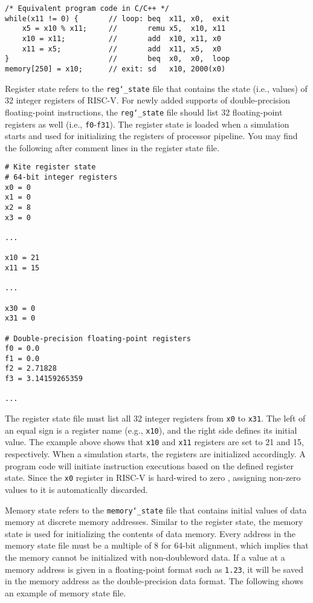 \documentclass[10pt]{article}
\begin{document}
\begin{Verbatim}[frame=single]
/* Equivalent program code in C/C++ */
while(x11 != 0) {       // loop: beq  x11, x0,  exit
    x5 = x10 % x11;     //       remu x5,  x10, x11
    x10 = x11;          //       add  x10, x11, x0
    x11 = x5;           //       add  x11, x5,  x0
}                       //       beq  x0,  x0,  loop
memory[250] = x10;      // exit: sd   x10, 2000(x0)
\end{Verbatim}

Register state refers to the {\tt reg\char`_state} file that contains the state (i.e., values) of 32 integer registers of RISC-V.
For newly added supports of double-precision floating-point instructions, the {\tt reg\char`_state} file should list 32 floating-point registers as well (i.e., {\tt f0}-{\tt f31}).
The register state is loaded when a simulation starts and used for initializing the registers of processor pipeline.
You may find the following after comment lines in the register state file.

\begin{Verbatim}[frame=single]
# Kite register state
# 64-bit integer registers
x0 = 0
x1 = 0
x2 = 8
x3 = 0

...

x10 = 21
x11 = 15

...

x30 = 0
x31 = 0

# Double-precision floating-point registers
f0 = 0.0
f1 = 0.0
f2 = 2.71828
f3 = 3.14159265359

...
\end{Verbatim}

The register state file must list all 32 integer registers from {\tt x0} to {\tt x31}.
The left of an equal sign is a register name (e.g., {\tt x10}), and the right side defines its initial value.
The example above shows that {\tt x10} and {\tt x11} registers are set to 21 and 15, respectively.
When a simulation starts, the registers are initialized accordingly.
A program code will initiate instruction executions based on the defined register state.
Since the {\tt x0} register in RISC-V is hard-wired to zero \cite{patterson_morgan2017}, assigning non-zero values to it is automatically discarded.

Memory state refers to the {\tt memory\char`_state} file that contains initial values of data memory at discrete memory addresses.
Similar to the register state, the memory state is used for initializing the contents of data memory.
Every address in the memory state file must be a multiple of 8 for 64-bit alignment, which implies that the memory cannot be initialized with non-doubleword data.
If a value at a memory address is given in a floating-point format such as {\tt 1.23}, it will be saved in the memory address as the double-precision data format.
The following shows an example of memory state file.
\end{document}
